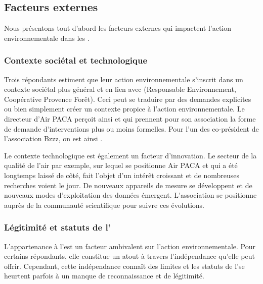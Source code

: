     \subsection{Facteurs externes}
    Nous présentons tout d'abord les facteurs externes qui impactent l'action environnementale dans les \oess.
        \subsubsection{Contexte sociétal et technologique}
        Trois répondants estiment que leur action environnementale s'inscrit dans un contexte sociétal plus général et en lien avec  (Responsable Environnement, Coopérative Provence Forêt). Ceci peut se traduire par des demandes explicites ou bien simplement créer un contexte propice à l'action environnementale.  Le directeur d’Air PACA perçoit ainsi  et qui prennent pour son association la forme de demande d'interventions plus ou moins formelles. Pour l'un des co-président de l'association Bzzz, on est ainsi .

        Le contexte technologique est également un facteur d'innovation. Le secteur de la qualité de l'air par exemple, sur lequel se positionne Air PACA et qui a été longtemps laissé de côté, fait l'objet d'un intérêt croissant et de nombreuses recherches voient le jour. De nouveaux appareils de mesure se développent et de nouveaux modes d'exploitation des données émergent. L'association se positionne auprès de la communauté scientifique pour suivre ces évolutions.

        \subsubsection{Légitimité et statuts de l'\ess}
        L'appartenance à l'\ess est un facteur ambivalent sur l'action environnementale. Pour certains répondants, elle constitue un atout à travers l'indépendance qu'elle peut offrir. Cependant, cette indépendance connaît des limites et les statuts de l'\ess se heurtent parfois à un manque de reconnaissance et de légitimité.

